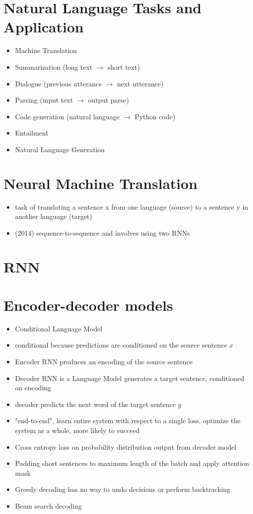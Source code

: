 \documentclass[../main.tex]{subfiles}
\begin{document}
\section{Natural Language Tasks and Application}

\begin{itemize}
  \item Machine Translation
  \item Summarization (long text $\rightarrow$ short text)
  \item Dialogue (previous utterance $\rightarrow$ next utterance)
  \item Parsing (input text $\rightarrow$ output parse)
  \item Code generation (natural language $\rightarrow$ Python code)
  \item Entailment
  \item Natural Language Generation
\end{itemize}

\section{Neural Machine Translation}

\begin{itemize}
  \item task of translating a sentence x from one language (source) to a sentence y in another language (target)
  \item (2014) sequence-to-sequence and involves using two RNNs
\end{itemize}

\section{RNN}

\section{Encoder-decoder models}
\begin{itemize}
  \item Conditional Language Model
  \item conditional because predictions are conditioned on the source sentence $x$
  \item Encoder RNN produces an encoding of the source sentence
  \item Decoder RNN is a Language Model generates a target sentence, conditioned on encoding
  \item decoder predicts the next word of the target sentence $y$
  \item "end-to-end", learn entire system with respect to a single loss, optimize the system as a whole, more likely to succeed
  \item Cross entropy loss on probability distribution output from decoder model
  \item Padding short sentences to maximum length of the batch and apply attention mask
  \item Greedy decoding has no way to undo decisions or perform backtracking
  \item Beam search decoding
\end{itemize}
\end{document}
